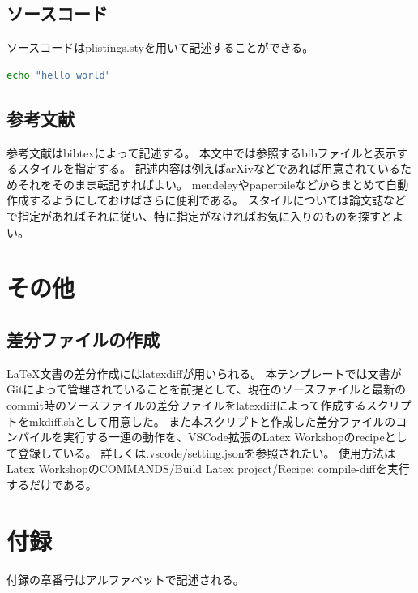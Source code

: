 \documentclass[uplatex]{jsarticle}
\begin{document}
\subsection{ソースコード}
ソースコードはplistings.styを用いて記述することができる。
\begin{lstlisting}[language=sh, caption=hello world]
echo "hello world"
\end{lstlisting}

\subsection{参考文献}
参考文献はbibtexによって記述する。
本文中では参照するbibファイルと表示するスタイルを指定する。
記述内容は例えばarXivなどであれば用意されているためそれをそのまま転記すればよい。
mendeleyやpaperpileなどからまとめて自動作成するようにしておけばさらに便利である。
スタイルについては論文誌などで指定があればそれに従い、特に指定がなければお気に入りのものを探すとよい。


\section{その他}
\subsection{差分ファイルの作成}
\LaTeX 文書の差分作成にはlatexdiffが用いられる。
本テンプレートでは文書がGitによって管理されていることを前提として、現在のソースファイルと最新のcommit時のソースファイルの差分ファイルをlatexdiffによって作成するスクリプトをmkdiff.shとして用意した。
また本スクリプトと作成した差分ファイルのコンパイルを実行する一連の動作を、VSCode拡張のLatex Workshopのrecipeとして登録している。
詳しくは.vscode/setting.jsonを参照されたい。
使用方法はLatex WorkshopのCOMMANDS/Build Latex project/Recipe: compile-diffを実行するだけである。



% 



\newpage
\appendix

\section{付録}
付録の章番号はアルファベットで記述される。
\end{document}

